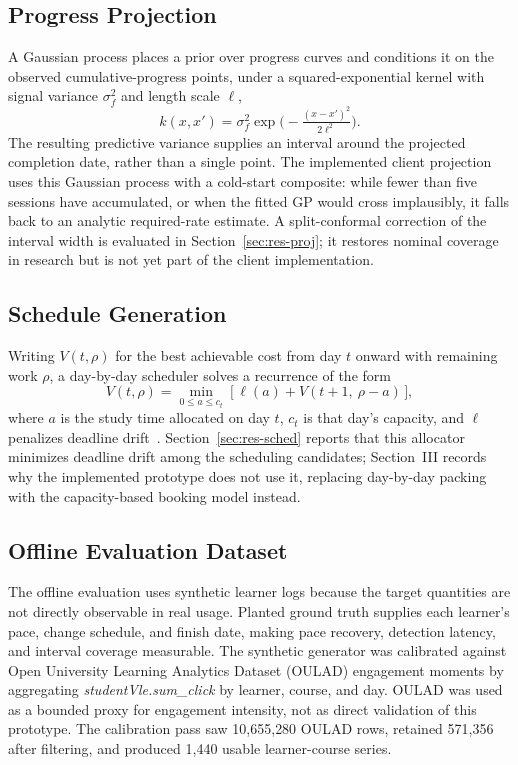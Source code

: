 \documentclass[conference]{IEEEtran}
\begin{document}
\subsection{Progress Projection}
\label{sec:method-proj}
A Gaussian process places a prior over progress curves and conditions it on the observed cumulative-progress points, under a squared-exponential kernel with signal variance $\sigma_f^2$ and length scale $\ell$,
\begin{equation}
k(x,x') = \sigma_f^2 \exp\!\Big(-\tfrac{(x-x')^2}{2\ell^2}\Big).
\label{eq:gp-kernel}
\end{equation}
The resulting predictive variance supplies an interval around the projected completion date, rather than a single point. The implemented client projection uses this Gaussian process with a cold-start composite: while fewer than five sessions have accumulated, or when the fitted GP would cross implausibly, it falls back to an analytic required-rate estimate. A split-conformal correction of the interval width is evaluated in Section~\ref{sec:res-proj}; it restores nominal coverage in research but is not yet part of the client implementation.

\subsection{Schedule Generation}
\label{sec:method-sched}
Writing $V(t,\rho)$ for the best achievable cost from day $t$ onward with remaining work $\rho$, a day-by-day scheduler solves a recurrence of the form
\begin{equation}
V(t,\rho) = \min_{0 \le a \le c_t}\ \big[\, \ell(a) + V(t+1,\ \rho - a)\,\big],
\label{eq:dp}
\end{equation}
where $a$ is the study time allocated on day $t$, $c_t$ is that day's capacity, and $\ell$ penalizes deadline drift~\cite{islam2024}. Section~\ref{sec:res-sched} reports that this allocator minimizes deadline drift among the scheduling candidates; Section~III records why the implemented prototype does not use it, replacing day-by-day packing with the capacity-based booking model instead.

\subsection{Offline Evaluation Dataset}
\label{sec:method-data}
The offline evaluation uses synthetic learner logs because the target quantities are not directly observable in real usage. Planted ground truth supplies each learner's pace, change schedule, and finish date, making pace recovery, detection latency, and interval coverage measurable. The synthetic generator was calibrated against Open University Learning Analytics Dataset (OULAD) engagement moments by aggregating \emph{studentVle.sum\_click} by learner, course, and day. OULAD was used as a bounded proxy for engagement intensity, not as direct validation of this prototype. The calibration pass saw 10{,}655{,}280 OULAD rows, retained 571{,}356 after filtering, and produced 1{,}440 usable learner-course series.
\end{document}
